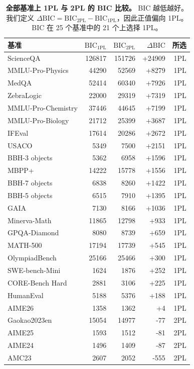 \begin{table}[t]
\centering
\small
\caption{\textbf{全部基准上 1PL 与 2PL 的 BIC 比较。}
BIC 越低越好。我们定义 $\Delta\mathrm{BIC}=\mathrm{BIC}_{\mathrm{2PL}}-\mathrm{BIC}_{\mathrm{1PL}}$，因此正值偏向 1PL。BIC 在 25 个基准中的 21 个上选择 1PL。}
\label{tab:irt_bic_1pl_2pl}
\begin{tabular}{lrrrr}
\toprule
\textbf{基准} & \textbf{$\mathrm{BIC}_{\mathrm{1PL}}$} & \textbf{$\mathrm{BIC}_{\mathrm{2PL}}$} & \textbf{$\Delta\mathrm{BIC}$} & \textbf{所选} \\
\midrule
ScienceQA & 126817 & 151726 & +24909 & 1PL \\
MMLU-Pro-Physics & 44290 & 52569 & +8279 & 1PL \\
MedQA & 52414 & 60340 & +7926 & 1PL \\
ZebraLogic & 22000 & 29319 & +7319 & 1PL \\
MMLU-Pro-Chemistry & 37446 & 44645 & +7199 & 1PL \\
MMLU-Pro-Biology & 21712 & 25399 & +3687 & 1PL \\
IFEval & 17614 & 20286 & +2672 & 1PL \\
USACO & 5349 & 7500 & +2151 & 1PL \\
BBH-3 objects & 5362 & 6958 & +1596 & 1PL \\
MBPP+ & 14222 & 15778 & +1556 & 1PL \\
BBH-7 objects & 6838 & 8260 & +1422 & 1PL \\
BBH-5 objects & 6515 & 7910 & +1395 & 1PL \\
GAIA & 7130 & 8166 & +1036 & 1PL \\
Minerva-Math & 11865 & 12798 & +933 & 1PL \\
GPQA-Diamond & 8080 & 8739 & +659 & 1PL \\
MATH-500 & 17194 & 17739 & +545 & 1PL \\
OlympiadBench & 25166 & 25466 & +300 & 1PL \\
SWE-bench-Mini & 1624 & 1876 & +252 & 1PL \\
CORE-Bench Hard & 2881 & 3106 & +225 & 1PL \\
HumanEval & 5188 & 5376 & +188 & 1PL \\
AIME26 & 1358 & 1362 & +4 & 1PL \\
\midrule
Gaokao2023en & 15054 & 14977 & -77 & 2PL \\
AIME25 & 1593 & 1512 & -81 & 2PL \\
AIME24 & 1496 & 1409 & -87 & 2PL \\
AMC23 & 2607 & 2052 & -555 & 2PL \\
\bottomrule
\end{tabular}
\end{table}

